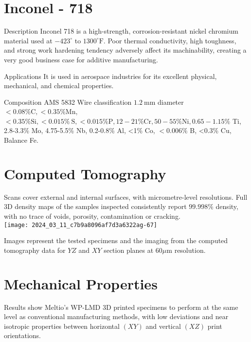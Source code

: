 \documentclass[10pt]{article}
\begin{document}
\section*{Inconel - 718}
Description Inconel 718 is a high-strength, corrosion-resistant nickel chromium material used at $-423^{\circ}$ to $1300^{\circ} \mathrm{F}$. Poor thermal conductivity, high toughness, and strong work hardening tendency adversely affect its machinability, creating a very good business case for additive manufacturing.

Applications It is used in aerospace industries for its excellent physical, mechanical, and chemical properties.

Composition AMS 5832 Wire classification $1.2 \mathrm{~mm}$ diameter $<0.08 \% \mathrm{C},<0.35 \% \mathrm{Mn}$, $<0.35 \% \mathrm{Si},<0.015 \% \mathrm{~S},<0.015 \% \mathrm{P}, 12-21 \% \mathrm{Cr}, 50-55 \% \mathrm{Ni}, 0.65-1.15 \%$ Ti, 2.8-3.3\% Mo, 4.75-5.5\% Nb, 0.2-0.8\% Al, <1\% Co, $<0.006 \%$ B, <0.3\% $\mathrm{Cu}$, Balance Fe.

\section*{Computed Tomography}
Scans cover external and internal surfaces, with micrometre-level resolutions. Full 3D density maps of the samples inspected consistently report $99.998 \%$ density, with no trace of voids, porosity, contamination or cracking.\\
\texttt{[image: 2024\_03\_11\_c7b9a8096af7d3a6322ag-67]}

Images represent the tested specimens and the imaging from the computed tomography data for $Y Z$ and $X Y$ section planes at $60 \mu \mathrm{m}$ resolution.

\section*{Mechanical Properties}
Results show Meltio's WP-LMD 3D printed specimens to perform at the same level as conventional manufacturing methods, with low deviations and near isotropic properties between horizontal $(X Y)$ and vertical $(X Z)$ print orientations.
\end{document}
